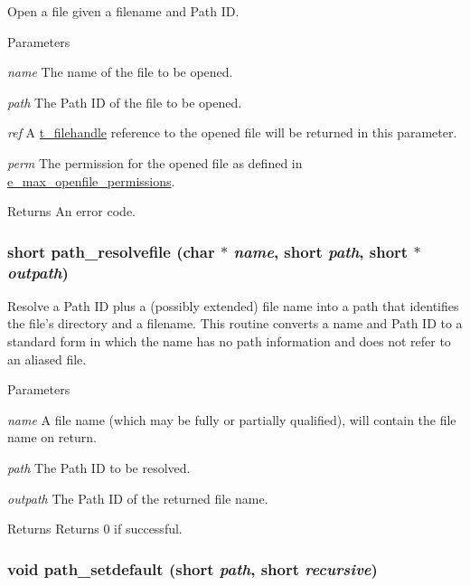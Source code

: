 Open a file given a filename and Path ID. 
\begin{DoxyParams}{Parameters}
\item[{\em name}]The name of the file to be opened. \item[{\em path}]The Path ID of the file to be opened. \item[{\em ref}]A \hyperlink{group__files_gafcb776aa74d514754e83b30995b5a5d1}{t\_\-filehandle} reference to the opened file will be returned in this parameter. \item[{\em perm}]The permission for the opened file as defined in \hyperlink{group__files_ga51fbee9f65e7ece2cae5c1e34150b7b3}{e\_\-max\_\-openfile\_\-permissions}. \end{DoxyParams}
\begin{DoxyReturn}{Returns}
An error code. 
\end{DoxyReturn}
\hypertarget{group__files_gaa6b2d2754cc0ba75a93deb186d326be8}{
\subsubsection[{path\_\-resolvefile}]{\setlength{\rightskip}{0pt plus 5cm}short path\_\-resolvefile (char $\ast$ {\em name}, \/  short {\em path}, \/  short $\ast$ {\em outpath})}}
\label{group__files_gaa6b2d2754cc0ba75a93deb186d326be8}


Resolve a Path ID plus a (possibly extended) file name into a path that identifies the file’s directory and a filename. This routine converts a name and Path ID to a standard form in which the name has no path information and does not refer to an aliased file.


\begin{DoxyParams}{Parameters}
\item[{\em name}]A file name (which may be fully or partially qualified), will contain the file name on return. \item[{\em path}]The Path ID to be resolved. \item[{\em outpath}]The Path ID of the returned file name.\end{DoxyParams}
\begin{DoxyReturn}{Returns}
Returns 0 if successful. 
\end{DoxyReturn}
\hypertarget{group__files_ga57ecd9b35a253cc980f911c7f7c1854b}{
\subsubsection[{path\_\-setdefault}]{\setlength{\rightskip}{0pt plus 5cm}void path\_\-setdefault (short {\em path}, \/  short {\em recursive})}}
\label{group__files_ga57ecd9b35a253cc980f911c7f7c1854b}


